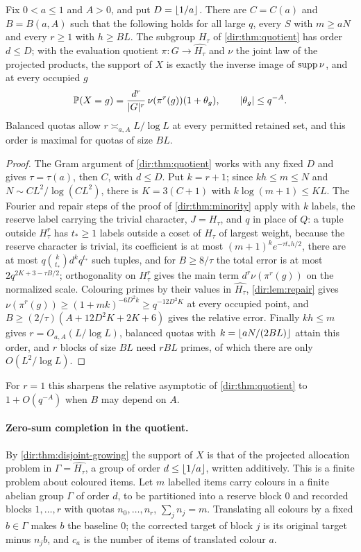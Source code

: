 \begin{theorem}\label{dir:thm:disjoint-growing}
Fix $0<a\le1$ and $A>0$, and put $D=\lfloor1/a\rfloor$. There are $C=C(a)$ and $B=B(a,A)$ such that the
following holds for all large $q$, every $S$ with $m\ge aN$ and every $r\ge1$ with $h\ge BL$. The
subgroup $H_\tau$ of \cref{dir:thm:quotient} has order $d\le D$; with the evaluation quotient
$\pi\colon G\to\widehat{H_\tau}$ and $\nu$ the joint law of the projected products, the support of $X$ is
exactly the inverse image of $\operatorname{supp}\nu$, and at every occupied $g$
\[
 \mathbb{P}(X=g)=\frac{d^r}{\lvert G\rvert^r}\,\nu(\pi^r(g))(1+\theta_g),\qquad\lvert\theta_g\rvert\le q^{-A}.
\]
Balanced quotas allow $r\asymp_{a,A}L/\log L$ at every permitted retained set, and this order is
maximal for quotas of size $BL$.
\end{theorem}

\begin{proof}
The Gram argument of \cref{dir:thm:quotient} works with any fixed $D$ and gives $\tau=\tau(a)$, then
$C$, with $d\le D$. Put $k=r+1$; since $kh\le m\le N$ and $N\sim CL^2/\log(CL^2)$, there is $K=3(C+1)$
with $k\log(m+1)\le KL$. The Fourier and repair steps of the proof of \cref{dir:thm:minority} apply
with $k$ labels, the reserve label carrying the trivial character, $J=H_\tau$, and $q$ in place of
$Q$: a tuple outside $H_\tau^r$ has $t_*\ge1$ labels outside a coset of $H_\tau$ of largest weight,
because the reserve character is trivial, its coefficient is at most $(m+1)^ke^{-\tau t_*h/2}$, there
are at most $q\binom k{t_*}d^kq^{t_*}$ such tuples, and for $B\ge8/\tau$ the total error is at most
$2q^{2K+3-\tau B/2}$; orthogonality on $H_\tau^r$ gives the main term $d^r\nu(\pi^r(g))$ on the
normalized scale. Colouring primes by their values in $\widehat{H_\tau}$, \cref{dir:lem:repair} gives
$\nu(\pi^r(g))\ge(1+mk)^{-6D^2k}\ge q^{-12D^2K}$ at every occupied point, and
$B\ge(2/\tau)(A+12D^2K+2K+6)$ gives the relative error. Finally $kh\le m$ gives $r=O_{a,A}(L/\log L)$,
balanced quotas with $k=\lfloor aN/(2BL)\rfloor$ attain this order, and $r$ blocks of size $BL$ need $rBL$
primes, of which there are only $O(L^2/\log L)$.
\end{proof}

For $r=1$ this sharpens the relative asymptotic of \cref{dir:thm:quotient} to $1+O(q^{-A})$ when $B$
may depend on $A$.

\paragraph{Zero-sum completion in the quotient.}
By \cref{dir:thm:disjoint-growing} the support of $X$ is that of the projected allocation problem in
$\Gamma=\widehat{H_\tau}$, a group of order $d\le\lfloor1/a\rfloor$, written additively. This is a finite
problem about coloured items. Let $m$ labelled items carry colours in a finite abelian group $\Gamma$ of
order $d$, to be partitioned into a reserve block $0$ and recorded blocks $1,\dots,r$ with quotas
$n_0,\dots,n_r$, $\sum_jn_j=m$. Translating all colours by a fixed $b\in\Gamma$ makes $b$ the baseline
$0$; the corrected target of block $j$ is its original target minus $n_jb$, and $c_a$ is the number of
items of translated colour $a$.

